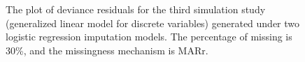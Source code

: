 	\begin{figure}[ht!]
		\begin{center}
		\end{center}
		\caption{The plot of deviance residuals for the third simulation study (generalized linear model for discrete variables) generated under two logistic regression imputation models. The percentage of missing is 30\%, and the missingness mechanism is MARr.}
		\label{fig6_8}
	\end{figure}
	

